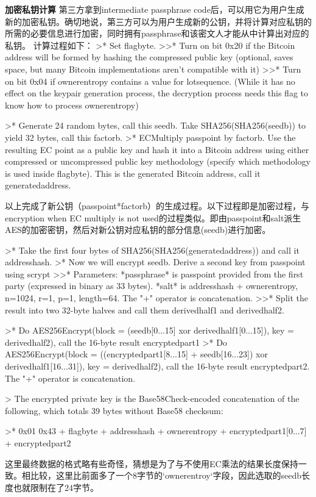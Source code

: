 \textbf{加密私钥计算}
第三方拿到intermediate passphrase code后，可以用它为用户生成新的加密私钥。确切地说，第三方可以为用户生成新的公钥，并将计算对应私钥的所需的必要信息进行加密，同时拥有passphrase和该密文人才能从中计算出对应的私钥。  
计算过程如下：
>* Set flagbyte.      
>>* Turn on bit 0x20 if the Bitcoin address will be formed by hashing the compressed public key (optional, saves space, but many Bitcoin implementations aren't compatible with it)
>>* Turn on bit 0x04 if ownerentropy contains a value for lotsequence. (While it has no effect on the keypair generation process, the decryption process needs this flag to know how to process ownerentropy)  

>* Generate 24 random bytes, call this seedb. Take SHA256(SHA256(seedb)) to yield 32 bytes, call this factorb.
>* ECMultiply passpoint by factorb. Use the resulting EC point as a public key and hash it into a Bitcoin address using either compressed or uncompressed public key methodology (specify which methodology is used inside flagbyte). This is the generated Bitcoin address, call it generatedaddress.

以上完成了新公钥（passpoint*factorb）的生成过程。以下过程即是加密过程，与encryption when EC multiply is not used的过程类似。即由passpoint和salt派生AES的加密密钥，然后对新公钥对应私钥的部分信息(seedb)进行加密。

>* Take the first four bytes of SHA256(SHA256(generatedaddress)) and call it addresshash.
>* Now we will encrypt seedb. Derive a second key from passpoint using scrypt  
>>* Parameters: *passphrase* is passpoint provided from the first party (expressed in binary as 33 bytes). *salt* is addresshash + ownerentropy, n=1024, r=1, p=1, length=64. The "+" operator is concatenation.
>>* Split the result into two 32-byte halves and call them derivedhalf1 and derivedhalf2.


>* Do AES256Encrypt(block = (seedb[0...15] xor derivedhalf1[0...15]), key = derivedhalf2), call the 16-byte result encryptedpart1
>* Do AES256Encrypt(block = ((encryptedpart1[8...15] + seedb[16...23]) xor derivedhalf1[16...31]), key = derivedhalf2), call the 16-byte result encryptedpart2. The "+" operator is concatenation.

> The encrypted private key is the Base58Check-encoded concatenation of the following, which totals 39 bytes without Base58 checksum:    

>* 0x01 0x43 + flagbyte + addresshash + ownerentropy +  encryptedpart1[0...7] + encryptedpart2

这里最终数据的格式略有些奇怪，猜想是为了与不使用EC乘法的结果长度保持一致。相比较，这里比前面多了一个8字节的`ownerentroy`字段，因此选取的seedb长度也就限制在了24字节。

